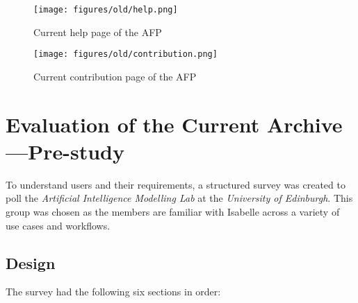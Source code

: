 \documentclass[bsc,frontabs,oneside,singlespacing,parskip,deptreport,logo]{infthesis}
\begin{document}
\begin{figure}[h]
    \centering
    \texttt{[image: figures/old/help.png]}
    \caption{Current help page of the AFP}

\end{figure}

\begin{figure}[h]
    \centering
    \texttt{[image: figures/old/contribution.png]}
    \caption{Current contribution page of the AFP}

\end{figure}

\chapter{Evaluation of the Current Archive---Pre-study} \label{prestudy}

To understand users and their requirements, a structured survey was created to poll the \textit{Artificial Intelligence Modelling Lab} at the \textit{University of Edinburgh}. This group was chosen as the members are familiar with Isabelle across a variety of use cases and workflows.

\section{Design}

The survey had the following six sections in order: 
\end{document}
